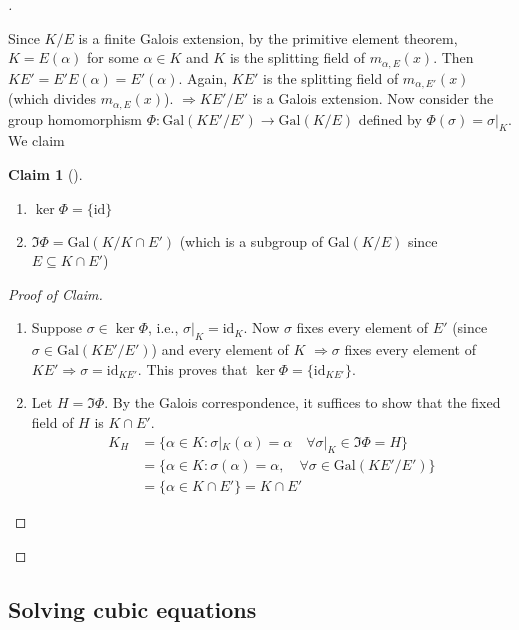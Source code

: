 \documentclass{article}
\theoremstyle{definition}
\newtheorem*{clm}{Claim}
\newenvironment{proofs}[1][\proofname]{%
  \begin{proof}[#1]$ $\par\nobreak\ignorespaces
}{%
  \end{proof}
}
\newenvironment{clms}[1][]{%
  \begin{clm}[#1]$ $\par\nobreak\ignorespaces
}{%
  \end{clm}
}
\newcommand{\Ra}{\Rightarrow}
\newcommand{\Gal}{\text{Gal}}
\newcommand{\id}{\text{id}}
\begin{document}
\begin{proofs}
	Since $K/E$ is a finite Galois extension, by the primitive element theorem, $K = E(\alpha)$ for some $\alpha \in K$ and $K$ is the splitting field of $m_{\alpha, E}(x)$.
	Then $K E' = E' E(\alpha) = E' (\alpha)$.
	Again, $K E'$ is the splitting field of $m_{\alpha, E'}(x)$ (which divides $m_{\alpha, E}(x)$). 
	$\Ra K E'/E'$ is a Galois extension.
	Now consider the group homomorphism $\Phi: \Gal(K E'/E') \to \Gal(K/E)$ defined by $\Phi(\sigma) = \sigma|_K$.
	We claim
	\begin{clms}
		\begin{enumerate}
			\item[(1)] $\ker \Phi = \{\id\}$ 

			\item[(2)] $\Im \Phi = \Gal(K/K \cap E')$ (which is a subgroup of $\Gal(K/E)$ since $E \subseteq K \cap E'$) 
		\end{enumerate}
	\end{clms}

	\begin{proofs}[Proof of Claim]
		\begin{enumerate}
			\item[(1)] Suppose $\sigma \in \ker \Phi$, i.e., $\sigma|_K = \id_K$.
				Now $\sigma$ fixes every element of $E'$ (since $\sigma \in \Gal(K E'/E')$) and every element of $K$
				$\Ra \sigma$ fixes every element of $K E' \Ra \sigma = \id_{K E'}$.
				This proves that $\ker \Phi = \{\id_{K E'}\}$.

			\item[(2)] Let $H = \Im \Phi$.
				By the Galois correspondence, it suffices to show that the fixed field of $H$ is $K \cap E'$.
				\[
					\begin{split}
						K_H &= \{\alpha \in K: \sigma|_K(\alpha) = \alpha \quad \forall \sigma|_K \in \Im \Phi = H\} \\
						&= \{\alpha \in K: \sigma(\alpha) = \alpha, \quad \forall \sigma \in \Gal(K E'/E')\}\\
						&= \{\alpha \in K \cap E'\} = K \cap E' 
					\end{split}
				\]
		\end{enumerate}
	\end{proofs}
\end{proofs}

\subsection*{Solving cubic equations}
\end{document}
